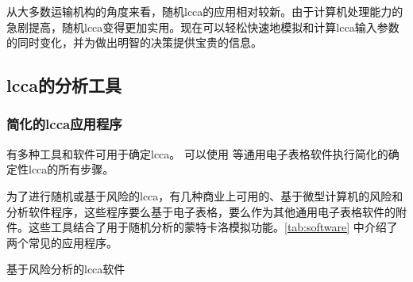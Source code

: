 从大多数运输机构的角度来看，随机\acrlong*{lcca}的应用相对较新。由于计算机处理能力的急剧提高，随机\acrlong*{lcca}变得更加实用。现在可以轻松快速地模拟和计算\acrlong*{lcca}输入参数的同时变化，并为做出明智的决策提供宝贵的信息。


\subsection{\texorpdfstring{\acrlong*{lcca}}{全生命周期成本分析}的分析工具}
\subsubsection{简化的\acrlong*{lcca}应用程序}
有多种工具和软件可用于确定\acrlong*{lcca}。 可以使用 \Microsoft[\Excel] 等通用电子表格软件执行简化的确定性\acrlong*{lcca}的所有步骤。

为了进行随机或基于风险的\acrlong*{lcca}，有几种商业上可用的、基于微型计算机的风险和分析软件程序，这些程序要么基于电子表格，要么作为其他通用电子表格软件的附件。这些工具结合了用于随机分析的蒙特卡洛模拟功能。\cref{tab:software} 中介绍了两个常见的应用程序。

\begin{table}
  \caption{基于风险分析的\acrlong*{lcca}软件}
  \label{tab:software}
  
\end{table}

